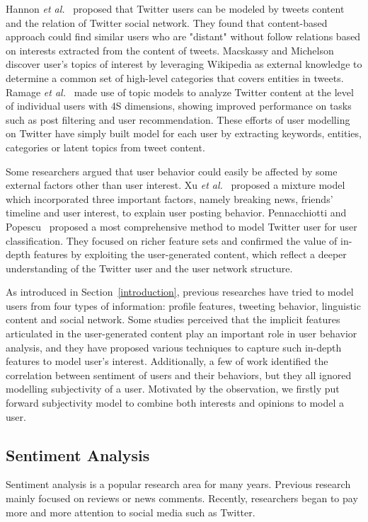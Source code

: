 \documentclass[smallcondensed]{svjour3}     %
\begin{document}
Hannon \emph{et al.}~\cite{Hannon:2010} proposed that Twitter users can be modeled by tweets content and the relation of Twitter social network.
They found that content-based approach could find similar users who are "distant" without follow relations based on interests extracted from the content of tweets. 
Macskassy and Michelson~\cite{conf/icwsm/MacskassyM11} discover user's topics of interest by leveraging Wikipedia as external knowledge to determine a common set of high-level categories that covers entities in tweets. 
Ramage \emph{et al.}~\cite{RamageEtAl:10} made use of topic models to analyze Twitter content at the level of individual users with 4S dimensions, showing improved performance on tasks such as post filtering and user recommendation. 
These efforts of user modelling on Twitter have simply built model for each user by extracting keywords, entities, categories or latent topics from tweet content. 

Some researchers argued that user behavior could easily be affected by some external factors other than user interest.
Xu \emph{et al.}~\cite{Xu:2012MUP} proposed a mixture model which incorporated three important factors, namely breaking news, friends' timeline and user interest, to explain user posting behavior.
Pennacchiotti and Popescu~\cite{Pennacchiotti:icwsm11} proposed a most comprehensive method to model Twitter user for user classification. They focused on richer feature sets and confirmed the value of in-depth features by exploiting the user-generated content, which reflect a deeper understanding of the Twitter user and the user network structure.

As introduced in Section~\ref{introduction}, previous researches have tried to model users from four types of information: profile features, tweeting behavior, linguistic content and social network. 
Some studies perceived that the implicit features articulated in the user-generated content play an important role in user behavior analysis, and they have proposed various techniques to capture such in-depth features to model user's interest. 
Additionally, a few of work identified the correlation between sentiment of users and their behaviors, but they all ignored modelling subjectivity of a user.
Motivated by the observation, we firstly put forward subjectivity model  to combine both interests and opinions to model a user.

\subsection{Sentiment Analysis}
Sentiment analysis is a popular research area for many years. Previous research mainly focused on reviews or news comments. 
Recently, researchers began to pay more and more attention to social media such as Twitter.
 
\end{document}
